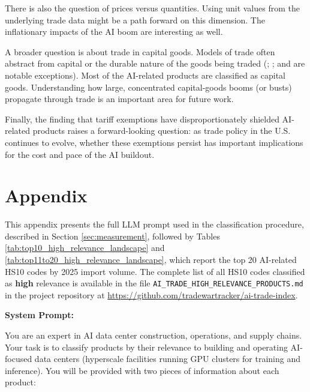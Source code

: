 \documentclass[12pt,pdftex]{article}
\newenvironment{prompt}{\par\medskip\noindent}{\par\medskip}
\begin{document}
\begin{onehalfspacing}
There is also the question of prices versus quantities. Using unit values from the underlying trade data might be a path forward on this dimension. The inflationary impacts of the AI boom are interesting as well.

A broader question is about trade in capital goods. Models of trade often abstract from capital or the durable nature of the goods being traded (\citealt{eaton2001capital}; \citealt{eaton2016trade}; and \citealt{ravikumar2019capital} are notable exceptions). Most of the AI-related products are classified as capital goods. Understanding how large, concentrated capital-goods booms (or busts) propagate through trade is an important area for future work.

Finally, the finding that tariff exemptions have disproportionately shielded AI-related products raises a forward-looking question: as trade policy in the U.S. continues to evolve, whether these exemptions persist has important implications for the cost and pace of the AI buildout.

\newpage



\appendix
\setcounter{table}{0}
\makeatletter
\renewcommand{\thetable}{A\@arabic\c@table}
\makeatother

\newpage

\section*{Appendix}\label{appendix}

This appendix presents the full LLM prompt used in the classification procedure, described in Section \ref{sec:measurement}, followed by Tables \ref{tab:top10_high_relevance_landscape} and \ref{tab:top11to20_high_relevance_landscape}, which report the top 20 AI-related HS10 codes by 2025 import volume. The complete list of all HS10 codes classified as \textbf{high} relevance is available in the file \texttt{AI\_TRADE\_HIGH\_RELEVANCE\_PRODUCTS.md} in the project repository at \url{https://github.com/tradewartracker/ai-trade-index}.

\begin{prompt}
\noindent

\textbf{System Prompt:}

\medskip

You are an expert in AI data center construction, operations, and supply chains. Your task is to classify products by their relevance to building and operating AI-focused data centers (hyperscale facilities running GPU clusters for training and inference). You will be provided with two pieces of information about each product:\\


\end{prompt}
\end{onehalfspacing}
\end{document}
